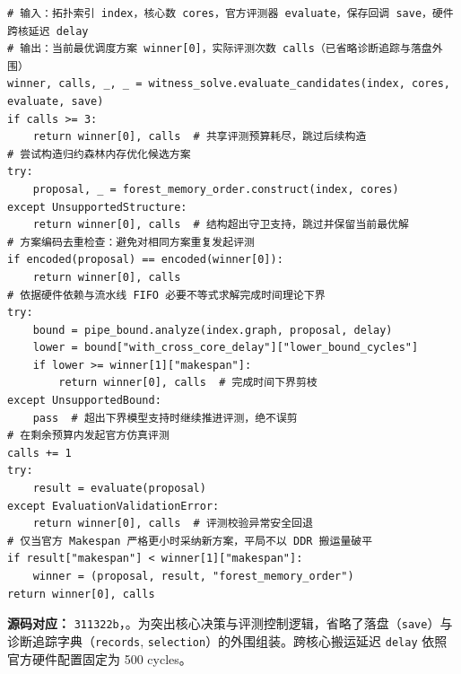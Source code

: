 \documentclass[anonymous,withtoc]{gmcm2026}
\renewcommand{\thealgorithm}{\thesection-\arabic{algorithm}}
\begin{document}
\FloatBarrier
\par{}\begingroup\normalsize
\captionsetup{type=algorithm,position=top,justification=raggedright,singlelinecheck=false,labelfont=bf}
\label{alg:p3-forest-solve}
\nopagebreak
\begin{tcolorbox}[enhanced,breakable,colback=white,colframe=black,
  boxrule=0pt,toprule=.4pt,bottomrule=.4pt,sharp corners,boxsep=0pt,
  left=0pt,right=0pt,top=4pt,bottom=4pt,before skip=2pt,after skip=2pt,
  title after break={算法~\thealgorithm（续）},
  colbacktitle=white,coltitle=black,fonttitle=\normalsize\bfseries]


\begin{lstlisting}[style=paperpseudo]
# 输入：拓扑索引 index，核心数 cores，官方评测器 evaluate，保存回调 save，硬件跨核延迟 delay
# 输出：当前最优调度方案 winner[0]，实际评测次数 calls（已省略诊断追踪与落盘外围）
winner, calls, _, _ = witness_solve.evaluate_candidates(index, cores, evaluate, save)
if calls >= 3:
    return winner[0], calls  # 共享评测预算耗尽，跳过后续构造
# 尝试构造归约森林内存优化候选方案
try:
    proposal, _ = forest_memory_order.construct(index, cores)
except UnsupportedStructure:
    return winner[0], calls  # 结构超出守卫支持，跳过并保留当前最优解
# 方案编码去重检查：避免对相同方案重复发起评测
if encoded(proposal) == encoded(winner[0]):
    return winner[0], calls
# 依据硬件依赖与流水线 FIFO 必要不等式求解完成时间理论下界
try:
    bound = pipe_bound.analyze(index.graph, proposal, delay)
    lower = bound["with_cross_core_delay"]["lower_bound_cycles"]
    if lower >= winner[1]["makespan"]:
        return winner[0], calls  # 完成时间下界剪枝
except UnsupportedBound:
    pass  # 超出下界模型支持时继续推进评测，绝不误剪
# 在剩余预算内发起官方仿真评测
calls += 1
try:
    result = evaluate(proposal)
except EvaluationValidationError:
    return winner[0], calls  # 评测校验异常安全回退
# 仅当官方 Makespan 严格更小时采纳新方案，平局不以 DDR 搬运量破平
if result["makespan"] < winner[1]["makespan"]:
    winner = (proposal, result, "forest_memory_order")
return winner[0], calls
\end{lstlisting}
\textbf{源码对应：} \texttt{311322b}，\texttt{}。为突出核心决策与评测控制逻辑，省略了落盘（\texttt{save}）与诊断追踪字典（\texttt{records}, \texttt{selection}）的外围组装。跨核心搬运延迟 \texttt{delay} 依照官方硬件配置固定为 500 cycles。

\end{tcolorbox}\endgroup
\end{document}
